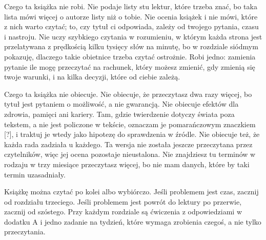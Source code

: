 Czego ta książka nie robi. Nie podaje listy stu lektur, które trzeba znać, bo taka lista mówi więcej
o autorze listy niż o tobie. Nie ocenia książek i nie mówi, które z nich warto czytać; to, czy
tytuł ci odpowiada, zależy od twojego pytania, czasu i nastroju. Nie uczy szybkiego czytania
w rozumieniu, w którym każda strona jest przelatywana z prędkością kilku tysięcy słów na minutę,
bo w rozdziale siódmym pokazuję, dlaczego takie obietnice trzeba czytać ostrożnie. Robi jedno:
zamienia pytanie \glqq ile mogę przeczytać\grqq{} na rachunek, który możesz zmienić, gdy zmienią się
twoje warunki, i na kilka decyzji, które od ciebie zależą.

Czego ta książka nie obiecuje. Nie obiecuje, że przeczytasz dwa razy więcej, bo tytuł jest pytaniem
o możliwość, a nie gwarancją. Nie obiecuje efektów dla zdrowia, pamięci ani kariery. Tam, gdzie
twierdzenie dotyczy świata poza tekstem, a nie jest policzone w tekście, oznaczam je pomarańczowym znaczkiem [?], i traktuj je wtedy jako hipotezę do sprawdzenia w źródle. Nie obiecuje też,
że każda rada zadziała u każdego. Ta wersja nie została jeszcze przeczytana przez czytelników,
więc jej ocena pozostaje nieustalona. Nie znajdziesz tu terminów w rodzaju \glqq w trzy miesiące
przeczytasz więcej\grqq{}, bo nie mam danych, które by taki termin uzasadniały.

Książkę można czytać po kolei albo wybiórczo. Jeśli problemem jest czas, zacznij od rozdziału
trzeciego. Jeśli problemem jest powrót do lektury po przerwie, zacznij od szóstego. Przy każdym
rozdziale są ćwiczenia z odpowiedziami w dodatku A i jedno zadanie na tydzień, które wymaga zrobienia
czegoś, a nie tylko przeczytania.
